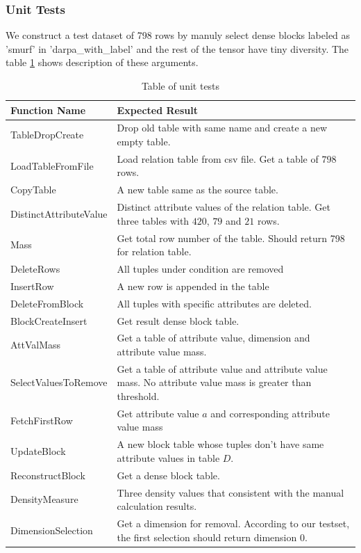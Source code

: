 \subsubsection{Unit Tests}
We construct a test dataset of 798 rows by manuly select dense blocks labeled as 'smurf' in 'darpa\_with\_label' and the rest of the tensor have tiny diversity. The table \ref{table:test} shows description of these arguments.
 
\begin{table}[h!]
\centering
\begin{tabular}{|p{5cm}|p{10cm}|}
 \hline
 Function Name & Expected Result \\ [0.5ex] 
 \hline\hline
 TableDropCreate & Drop old table with same name and create a new empty table. \\ 
 LoadTableFromFile & Load relation table from csv file. Get a table of $798$ rows. \\
 CopyTable & A new table same as the source table.\\
 DistinctAttributeValue & Distinct attribute values of the relation table. Get three tables with $420$, $79$ and $21$ rows. \\
 Mass & Get total row number of the table. Should return 798 for relation table. \\
 DeleteRows & All tuples under condition are removed \\
 InsertRow & A new row is appended in the table \\
 DeleteFromBlock & All tuples with specific attributes are deleted. \\
 BlockCreateInsert & Get result dense block table. \\
 AttValMass & Get a table of attribute value, dimension and attribute value mass. \\
 SelectValuesToRemove & Get a table of attribute value and attribute value mass. No attribute value mass is greater than threshold. \\
 FetchFirstRow & Get attribute value $a$ and corresponding attribute value mass \\ 
 UpdateBlock & A new block table whose tuples don't have same attribute values in table $D$. \\
 ReconstructBlock & Get a dense block table.\\
 DensityMeasure & Three density values that consistent with the manual calculation results. \\
 DimensionSelection & Get a dimension for removal. According to our testset, the first selection should return dimension $0$.\\ [1ex] 
 \hline
\end{tabular}
\caption{Table of unit tests}
\label{table:test}
\end{table}

